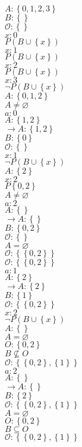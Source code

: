 \documentclass{article}
\let\union\cup
\let\emptyset\varnothing
\newcommand{\set}[1]{\left\{ {#1} \right\}}
\begin{document}
\def\ind{\phantom{$\rightarrow$}\hspace{1em}}
\def\nnd{$\rightarrow$\hspace{1em}}
\vspace{4ex}
\noindent
$A: \set{0,1,2,3}$\\
$B: \set{}$\\
$\mathcal O: \set{}$\\
$x:0$\\
$P(B\union\set x)$\\
$x:1$\\
$P(B\union\set x)$\\
$x:2$\\
$P(B\union\set x)$\\
$x:3$\\
$\neg P(B\union\set x)$\\
$A:\set{0,1,2}$\\
$A\not=\emptyset$\\
$a:0$\\
$A:\set{1,2}$\\
\nnd$A:\set{1,2}$\\
\ind$B:\set0$\\
\ind$\mathcal O:\set{}$\\
\ind$x:1$\\
\ind$\neg P(B\union\set x)$\\
\ind$A:\set{2}$\\
\ind$x:2$\\
\ind$P\set{0,2}$\\
\ind$A\not=\emptyset$\\
\ind$a:2$\\
\ind$A:\set{}$\\
\ind\nnd$A:\set{}$\\
\ind\ind$B:\set{0,2}$\\
\ind\ind$\mathcal O:\set{}$\\
\ind\ind$A=\emptyset$\\
\ind$\mathcal O:\set{\set{0,2}}$\\
$\mathcal O:\set{\set{0,2}}$\\
$a:1$\\
$A:\set2$\\
\nnd$A:\set{2}$\\
\ind$B:\set{1}$\\
\ind$\mathcal O:\set{\set{0,2}}$\\
\ind$x:2$\\
\ind$\neg P(B\union\set x)$\\
\ind$A:\set{}$\\
\ind$A=\emptyset$\\
\ind$O:\set{0,2}$\\
\ind$B\not\subseteq O$\\
$\mathcal O: \set{\set{0,2},\set1}$\\
$a:2$\\
$A:\set{}$\\
\nnd$A:\set{}$\\
\ind$B:\set{2}$\\
\ind$\mathcal O:\set{\set{0,2},\set1}$\\
\ind$A=\emptyset$\\
\ind$O:\set{0,2}$\\
\ind$B\subseteq O$\\
$\mathcal O: \set{\set{0,2},\set1}$\\
\end{document}
